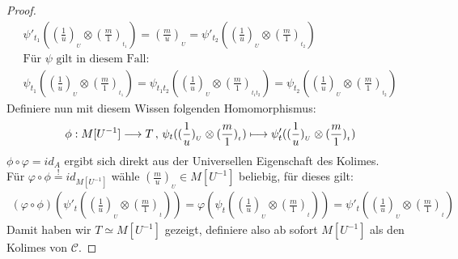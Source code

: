 \documentclass[10pt,a4paper]{report}
\newcommand{\function}[5]{\nolinebreak{#1:#2 \longrightarrow #3 \, , \, #4 \longmapsto #5}}
\newcommand{\tensor}[3]{#1 \otimes #3}
\newcommand{\lok}[2]{#1 [#2^{-1}]}
\newcommand{\loke}[3]{(\frac{#1}{#2})_{_{#3}}}
\newcommand*{\defshow}{\stackrel{!}{=}}
\begin{document}
\begin{proof}
\begin{gather*}
\psi'_{t_1}({\tensor{\loke{1}{u}{U}}{\lok{M}{t_1}}{\loke{m}{1}{t_1}}}) 
= \loke{m}{u}{U} 
= \psi'_{t_2}({\tensor{\loke{1}{u}{U}}{\lok{M}{t_2}}{\loke{m}{1}{t_2}}})\\
\text{Für $\psi$ gilt in diesem Fall: }\\
\psi_{t_1}({\tensor{\loke{1}{u}{U}}{\lok{M}{t_1}}{\loke{m}{1}{t_1}}})
= \psi_{t_1t_2}({\tensor{\loke{1}{u}{U}}{\lok{M}{t_1t_2}}{\loke{m}{1}{t_1t_2}}})
= \psi_{t_2}({\tensor{\loke{1}{u}{U}}{\lok{M}{t_2}}{\loke{m}{1}{t_2}}})
\end{gather*}
Definiere nun mit diesem Wissen folgenden Homomorphismus:
\begin{gather*}
\function{\phi}{\lok{M}{U}}{T}{\psi_t(\tensor{\loke{1}{u}{U}}{\lok{M}{t}}{\loke{m}{1}{t}})}{\psi'_t(\tensor{\loke{1}{u}{U}}{\lok{M}{t}}{\loke{m}{1}{t}})}
\end{gather*}
$\phi \circ \varphi = id_A$ ergibt sich direkt aus der Universellen Eigenschaft des Kolimes.\\
Für $\varphi \circ \phi \defshow id_{\lok{M}{U}}$ wähle $\loke{m}{u}{U} \in \lok{M}{U}$ beliebig, für dieses gilt:
\begin{gather*}
(\varphi \circ \phi) (\psi'_t(\tensor{\loke{1}{u}{U}}{\lok{M}{t}}{\loke{m}{1}{t}}))
 =\varphi(\psi_t(\tensor{\loke{1}{u}{U}}{\lok{M}{t}}{\loke{m}{1}{t}}))
  =\psi'_t(\tensor{\loke{1}{u}{U}}{\lok{M}{t}}{\loke{m}{1}{t}})
\end{gather*}
Damit haben wir $T \simeq \lok{M}{U}$ gezeigt, definiere also ab sofort $\lok{M}{U}$ als den Kolimes von $\mathcal{C}$.
\end{proof}
\end{document}

